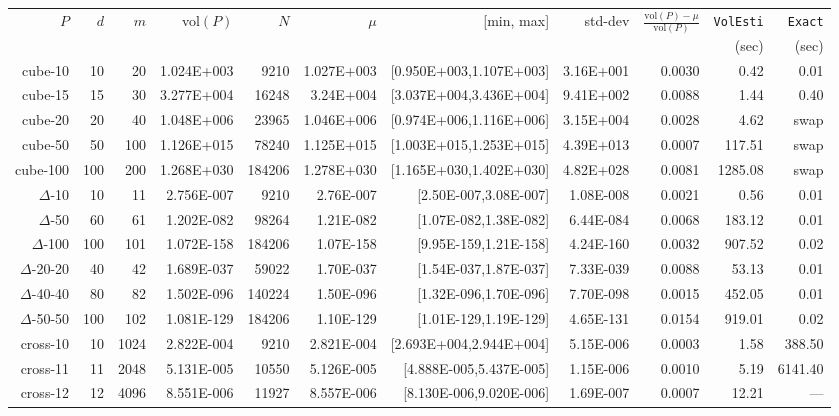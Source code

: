 \documentclass[11pt,a4paper]{article}
\def\vol{\mbox{vol}}
\def\vol{\mbox{vol}}
\begin{document}
\begin{table}[t!]\centering\tiny
\begin{tabular*}{\linewidth}{@{\extracolsep{\fill}}r@{\quad}r@{\quad}r@{\quad}r
@{\quad}r@{\quad}r@{\quad}r@{\quad}r@{~}r@{\quad}r@{\quad}r}
$P$ & $d$ & $m$  & \vol$(P)$ & $N$ & $\mu$ & [min, max]  & std-dev &  
\multirow{2}{*}{$\frac{\vol(P)-\mu}{\vol(P)}$} & {\tt VolEsti} & {\tt Exact}\\
& & & & & & & & & (sec) & (sec)\\\hline
cube-10 & 10 & 20 & 1.024E+003 & 9210 & 1.027E+003 & [0.950E+003,1.107E+003] & 3.16E+001 & 0.0030 & 0.42 & 0.01\\
cube-15 & 15 & 30 & 3.277E+004 & 16248 & 3.24E+004 & [3.037E+004,3.436E+004] & 9.41E+002 & 0.0088 & 1.44 & 0.40\\
cube-20 & 20 & 40 & 1.048E+006 & 23965 & 1.046E+006 & [0.974E+006,1.116E+006] & 3.15E+004 & 0.0028 & 4.62 & swap\\
cube-50 & 50 & 100 & 1.126E+015 & 78240 & 1.125E+015 & [1.003E+015,1.253E+015] & 4.39E+013 & 0.0007 & 117.51 & swap\\
cube-100 & 100 & 200 & 1.268E+030 & 184206 & 1.278E+030 & [1.165E+030,1.402E+030] & 4.82E+028 & 0.0081 & 1285.08 & swap\\
$\Delta$-10 & 10 & 11 & 2.756E-007 & 9210 & 2.76E-007 & [2.50E-007,3.08E-007] & 1.08E-008 & 0.0021 & 0.56 & 0.01\\
$\Delta$-50 & 60 & 61 & 1.202E-082 & 98264 & 1.21E-082 & [1.07E-082,1.38E-082] & 6.44E-084 & 0.0068 & 183.12 & 0.01\\
$\Delta$-100 & 100 & 101 & 1.072E-158 & 184206 & 1.07E-158 & [9.95E-159,1.21E-158] & 4.24E-160 & 0.0032 & 907.52 & 0.02\\
$\Delta$-20-20 & 40 & 42 & 1.689E-037 & 59022 & 1.70E-037 & [1.54E-037,1.87E-037] & 7.33E-039 & 0.0088 & 53.13 & 0.01\\
$\Delta$-40-40 & 80 & 82 & 1.502E-096 & 140224 & 1.50E-096 & [1.32E-096,1.70E-096] & 7.70E-098 & 0.0015 & 452.05 & 0.01\\
$\Delta$-50-50 & 100 & 102 & 1.081E-129 & 184206 & 1.10E-129 & [1.01E-129,1.19E-129] & 4.65E-131 & 0.0154 & 919.01 & 0.02\\
cross-10 & 10 & 1024 & 2.822E-004 & 9210 & 2.821E-004 & [2.693E+004,2.944E+004] & 5.15E-006 & 0.0003 & 1.58 & 388.50\\
cross-11 & 11 & 2048 & 5.131E-005 & 10550 & 5.126E-005 & [4.888E-005,5.437E-005] & 1.15E-006 & 0.0010 & 5.19 & 6141.40\\
cross-12 & 12 & 4096 & 8.551E-006 & 11927 & 8.557E-006 & [8.130E-006,9.020E-006] & 1.69E-007 & 0.0007 & 12.21 & ---\\

\end{tabular*}
\end{table}
\end{document}

